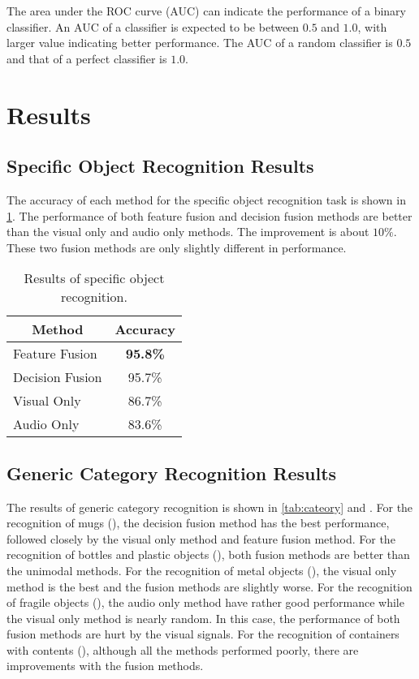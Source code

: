 \documentclass[12pt,final,twoside]{report}
\begin{document}
The area under the ROC curve (AUC) can indicate the performance of a binary classifier. An AUC of a classifier is expected to be between $0.5$ and $1.0$, with larger value indicating better performance. The AUC of a random classifier is $0.5$ and that of a perfect classifier is $1.0$.

\section{Results}
\subsection{Specific Object Recognition Results}
The accuracy of each method for the specific object recognition task is shown in \cref{tab:spec}. The performance of both feature fusion and decision fusion methods are better than the visual only and audio only methods. The improvement is about $10\%$. These two fusion methods are only slightly different in performance.

\begin{table}
  \caption{Results of specific object recognition.}
  \label{tab:spec}
  \centering
  \begin{tabular}[h!]{lc}
    \toprule
    \multicolumn{1}{c}{Method} & Accuracy \\ \midrule
    Feature Fusion & \textbf{95.8\%} \\
    Decision Fusion  & 95.7\% \\
    Visual Only & 86.7\% \\
    Audio Only & 83.6\% \\
    \bottomrule
  \end{tabular}
\end{table}

\subsection{Generic Category Recognition Results}
The results of generic category recognition is shown in \cref{tab:cateory} and . For the recognition of mugs (), the decision fusion method has the best performance, followed closely by the visual only method and feature fusion method. For the recognition of bottles and plastic objects (), both fusion methods are better than the unimodal methods. For the recognition of metal objects (), the visual only method is the best and the fusion methods are slightly worse. For the recognition of fragile objects (), the audio only method have rather good performance while the visual only method is nearly random. In this case, the performance of both fusion methods are hurt by the visual signals. For the recognition of containers with contents (), although all the methods performed poorly, there are improvements with the fusion methods.
\end{document}
